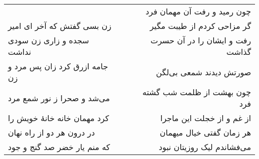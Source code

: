 \begin{center}
\begin{longtable}{l p{0.5cm} r}
&&
چون رمید و رفت آن مهمان فرد
\\
زن بسی گفتش که آخر ای امیر
&&
گر مزاحی کردم از طیبت مگیر
\\
سجده و زاری زن سودی نداشت
&&
رفت و ایشان را در آن حسرت گذاشت
\\
جامه ازرق کرد زان پس مرد و زن
&&
صورتش دیدند شمعی بی‌لگن
\\
می‌شد و صحرا ز نور شمع مرد
&&
چون بهشت از ظلمت شب گشته فرد
\\
کرد مهمان خانه خانهٔ خویش را
&&
از غم و از خجلت این ماجرا
\\
در درون هر دو از راه نهان
&&
هر زمان گفتی خیال میهمان
\\
که منم یار خضر صد گنج و جود
&&
می‌فشاندم لیک روزیتان نبود
\\
\end{longtable}
\end{center}

